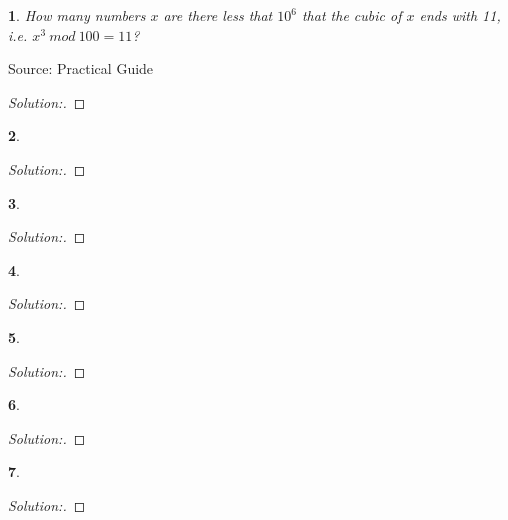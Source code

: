 \documentclass[10pt]{report}
\newtheorem{exe}{}[chapter]
\newenvironment{sol}{\begin{proof}[Solution:]}{\end{proof}}
\begin{document}
\begin{exe}
How many numbers $x$ are there less that $10^6$ that the cubic of $x$ ends with 11, i.e. $x^3\ mod\  100=11$?
\end{exe}
\begin{teacher}
Source: Practical Guide
\begin{sol}
\end{sol}
\end{teacher}

\begin{exe}

\end{exe}
\begin{teacher}
\begin{sol}
\end{sol}
\end{teacher}

\begin{exe}

\end{exe}
\begin{teacher}
\begin{sol}
\end{sol}
\end{teacher}

\begin{exe}

\end{exe}
\begin{teacher}
\begin{sol}
\end{sol}
\end{teacher}

\begin{exe}

\end{exe}
\begin{teacher}
\begin{sol}
\end{sol}
\end{teacher}

\begin{exe}

\end{exe}
\begin{teacher}
\begin{sol}
\end{sol}
\end{teacher}

\begin{exe}

\end{exe}
\begin{teacher}
\begin{sol}
\end{sol}
\end{teacher}
\end{document}
